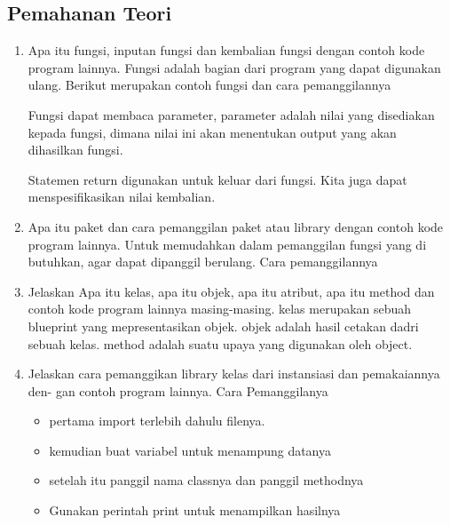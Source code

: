 \subsection{Pemahanan Teori}
\begin{enumerate}
    \item Apa itu fungsi, inputan fungsi dan kembalian fungsi dengan contoh kode program
    lainnya.
    Fungsi adalah bagian dari program yang dapat digunakan ulang.
    Berikut merupakan contoh fungsi dan cara pemanggilannya
    

    Fungsi dapat membaca parameter, parameter adalah nilai yang disediakan kepada fungsi, dimana nilai ini akan menentukan output yang akan dihasilkan fungsi.
    

    Statemen return digunakan untuk keluar dari fungsi. Kita juga dapat menspesifikasikan nilai kembalian.
    

    \item Apa itu paket dan cara pemanggilan paket atau library dengan contoh kode
    program lainnya.
    Untuk memudahkan dalam pemanggilan fungsi yang di butuhkan, agar dapat dipanggil berulang.
    Cara pemanggilannya
    

    \item Jelaskan Apa itu kelas, apa itu objek, apa itu atribut, apa itu method dan
    contoh kode program lainnya masing-masing.
    kelas merupakan sebuah blueprint yang mepresentasikan objek.
    objek adalah hasil cetakan dadri sebuah kelas.
    method adalah suatu upaya yang digunakan oleh object.
    

    \item Jelaskan cara pemanggikan library kelas dari instansiasi dan pemakaiannya den-
    gan contoh program lainnya.
    Cara Pemanggilanya 
    \begin{itemize}
        \item pertama import terlebih dahulu filenya.
        \item kemudian buat variabel untuk menampung datanya
        \item setelah itu panggil nama classnya dan panggil methodnya
        \item Gunakan perintah print untuk menampilkan hasilnya

    \end{itemize}
    


\end{enumerate}
